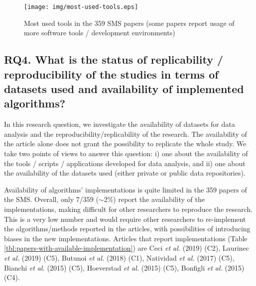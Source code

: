 \documentclass[journal]{IEEEtran}
\begin{document}
\begin{figure}[!htbp]
\centering

\centering
\texttt{[image: img/most-used-tools.eps]}
\caption{Most used tools in the 359 SMS papers (some papers report usage of more software tools / development environments)}
\label{figure:most-used-tools}
\end{figure}


\subsection{RQ4. What is the status of replicability / reproducibility of the studies in terms of datasets used and availability of implemented algorithms?}

In this research question, we investigate the availability of datasets for data analysis and the reproducibility/replicability of the research. The availability of the article alone does not grant the possibility to replicate the whole study. We take two points of views to answer this question: i) one about the availability of the tools / scripts / applications developed for data analysis, and ii) one about the availability of the datasets used (either private or public data repositories).

Availability of algorithms' implementations is quite limited in the 359 papers of the SMS. Overall, only 7/359 ($\sim$2\%) report the availability of the implementations, making difficult for other researchers to reproduce the research. This is a very low number and would require other researchers to re-implement the algorithms/methods reported in the articles, with possibilities of introducing biases in the new implementations.
Articles that report implementations (Table \ref{tbl:papers-with-available-implementation}) are Ceci \textit{et al.} (2019)  (C2), Laurinec \textit{et al.} (2019)  (C5), Butunoi \textit{et al.} (2018)  (C1), Natividad \textit{et al.} (2017)  (C5), Bianchi \textit{et al.} (2015) (C5),  Hoeverstad \textit{et al.} (2015)  (C5), Bonfigli \textit{et al.} (2015)  (C4).
\end{document}
